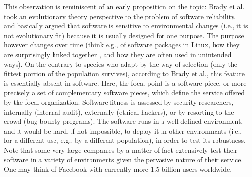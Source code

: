 This observation is reminiscent of an early proposition on the topic: Brady et al.  \cite{brady1999murphy} took an evolutionary theory perspective to the problem of software reliability, and basically argued that software is sensitive to environmental changes (i.e., it is not evolutionary fit) because it is usually designed for one purpose. The purpose however changes over time (think e.g., of software packages in Linux, how they are surprisingly linked together  \cite{maillart2008empirical}, and how they are often used in unintended ways). On the contrary to species who adapt by the way of selection (only the fittest portion of the population survives), according to Brady et al., this feature is essentially absent in software.
Here, the focal point is a software piece, or more precisely a set of complementary software pieces, which define the service offered by the focal organization. Software fitness is assessed by security researchers, internally (internal audit), externally (ethical hackers), or by resorting to the crowd (bug bounty programs). The software runs in a well-defined environment, and it would be hard, if not impossible, to deploy it in other environments (i.e., for a different use, e.g., by a different population), in order to test its robustness. Note that some very large companies by a matter of fact extensively test their software in a variety of environments given the pervasive nature of their service. One may think of Facebook with currently more 1.5 billion users worldwide.\\

